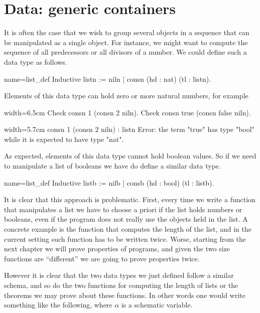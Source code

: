 \section{Data: generic containers}\label{sec:poly}

It is often the case that we wish to group several objects in a
sequence that can be manipulated as a single object.  For instance, we
might want to compute the sequence of all predecessors or all divisors
of a number.  We could define such a data type as follows.

\begin{coq}{name=list_def}{}
Inductive listn := niln | consn (hd : nat) (tl : listn).
\end{coq}

Elements of this data type can hold zero or more natural numbers, for example

\begin{coq}{}{width=6.5cm}
Check consn 1 (consn 2 niln).
Check consn true (consn false niln).
$~$
$~$
\end{coq}{}{}
\begin{coqout}{}{width=5.7cm}
consn 1 (consn 2 niln) : listn
Error: the term "true" has
type "bool" while it is
expected to have type "nat".
\end{coqout}{}{}

As expected, elements of this data type cannot hold boolean values.
So if we need to
manipulate a list of booleans we have do define a similar data type.

\begin{coq}{name=list_def}{}
Inductive listb := nilb | consb (hd : bool) (tl : listb).
\end{coq}

It is clear that this approach is problematic.  First, every time we
write a function that manipulates a list we have to choose a priori
if the list holds numbers or booleans, even if the program does not
really use the objects held in the list.
A concrete example is the function that computes the length of the list,
and in the current setting such function has to be written twice.
Worse, starting from the next chapter we will prove properties of programs,
and given the two size functions are ``different'' we are going to prove
properties twice.

However it is clear that the two data types we just defined follow
a similar schema, and so do the two functions for computing the length of lists
or the theorems we may prove about these functions.  In other words
one would write something
like the following, where $\alpha$ is a schematic variable.

